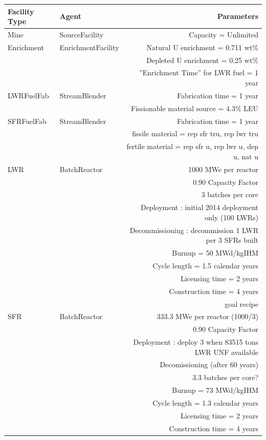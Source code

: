 \onecolumn
\begin{table}
\centering
\begin{tabular}{|l|l|r|}
\hline
\textbf{Facility Type} &\textbf{Agent} & \textbf{Parameters}\\
\hline
Mine & SourceFacility & Capacity = Unlimited\\
\hline
Enrichment & EnrichmentFacility & Natural U enrichment = 0.711 wt\% \\
& & Depleted U enrichment =  0.25 wt\% \\
& & ''Enrichment Time'' for LWR fuel = 1 year\\
\hline
LWRFuelFab & StreamBlender & Fabrication time = 1 year\\
& & Fissionable material source = 4.3\% LEU\\
\hline
SFRFuelFab & StreamBlender  & Fabrication time = 1 year\\
& & fissile material = rep sfr tru, rep lwr tru \\
& & fertile material = rep sfr u, rep lwr u, dep u, nat u \\
\hline
LWR & BatchReactor & 1000 MWe per reactor \\
& & 0.90 Capacity Factor \\
& & 3 batches per core \\ 
& & Deployment : initial 2014 deployment only (100 LWRs) \\
& & Decommissioning : decommission 1 LWR per 3 SFRs built \\
& & Burnup = 50 MWd/kgIHM \\
& & Cycle length = 1.5 calendar years \\
& & Licensing time = 2 years \\
& & Construction time = 4 years \\
& & goal recipe \\
\hline
SFR & BatchReactor & 333.3 MWe per reactor (1000/3) \\
& & 0.90 Capacity Factor \\
& & Deployment : deploy 3 when 83515 tons LWR UNF available \\ 
& & Decomissioning (after 60 years) \\
& & 3.3 batches per core? \\ 
& & Burnup = 73 MWd/kgIHM \\
& & Cycle length = 1.3 calendar years \\
& & Licensing time = 2 years \\
& & Construction time = 4 years \\

\end{tabular}
\end{table}
